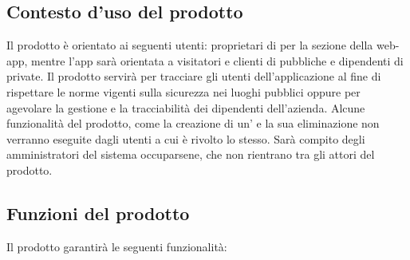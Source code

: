 \subsection{Contesto d'uso del prodotto}
Il prodotto è orientato ai seguenti utenti: proprietari di  per la sezione della web-app, mentre l'app sarà orientata a visitatori e clienti di  pubbliche e dipendenti di  private.
Il prodotto servirà per tracciare gli utenti dell'applicazione al fine di rispettare le norme vigenti sulla sicurezza nei luoghi pubblici oppure per agevolare la gestione e la tracciabilità dei dipendenti dell'azienda.
Alcune funzionalità del prodotto, come la creazione di un' e la sua eliminazione non verranno eseguite dagli utenti a cui è rivolto lo stesso. Sarà compito degli amministratori del sistema \NomeProgetto{} occuparsene, che non rientrano tra gli attori del prodotto.

\subsection{Funzioni del prodotto}
Il prodotto garantirà le seguenti funzionalità:

